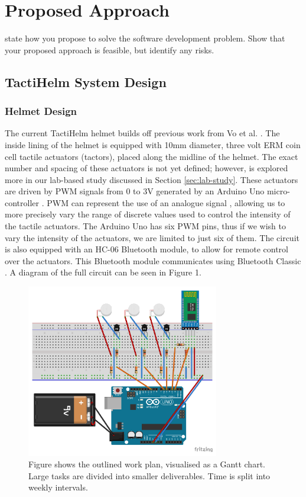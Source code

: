 \documentclass{interim}
\begin{document}
\section{Proposed Approach}

state how you propose to solve the software development problem. Show that your proposed approach is feasible, but identify any risks.

\subsection{TactiHelm System Design}
\subsubsection{Helmet Design}\label{sec:helmet-design}
The current TactiHelm helmet builds off previous work from Vo et al. \cite{10.1145/3411763.3451580}. The inside lining of the helmet is equipped with 10mm diameter, three volt ERM coin cell tactile actuators (tactors), placed along the midline of the helmet. The exact number and spacing of these actuators is not yet defined; however, is explored more in our lab-based study discussed in Section \ref{sec:lab-study}. These actuators are driven by PWM signals from 0 to 3V generated by an Arduino Uno micro-controller \cite{arduinouno}. PWM can represent the use of an analogue signal \cite{kart2001pulse}, allowing us to more precisely vary the range of discrete values used to control the intensity of the tactile actuators. The Arduino Uno has six PWM pins, thus if we wish to vary the intensity of the actuators, we are limited to just six of them. The circuit is also equipped with an HC-06 Bluetooth module, to allow for remote control over the actuators. This Bluetooth module communicates using Bluetooth Classic \cite{hc06}. A diagram of the full circuit can be seen in Figure 1.

\begin{figure}[!ht]
    \centering
    \includegraphics[width=0.75\textwidth]{images/circuit-design_bb.pdf}
    \caption{Figure shows the outlined work plan, visualised as a Gantt chart. Large tasks are divided into smaller deliverables. Time is split into weekly intervals.}
    \label{fig:work-plan}
\end{figure}
\end{document}
